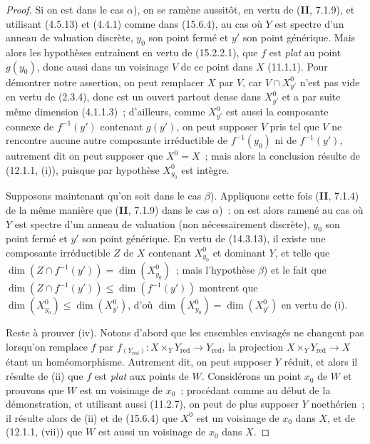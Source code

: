 \begin{proof}
Si on est dans le cas $\alpha$), on se ramène aussitôt, en vertu de (\textbf{II}, 7.1.9), et utilisant (4.5.13) et (4.4.1) comme dans (15.6.4), au cas où $Y$ est spectre d'un anneau de valuation discrète, $y_0$ son point fermé et $y'$ son point générique. Mais alors les hypothèses entraînent en vertu de (15.2.2.1), que $f$ est \emph{plat} au point $g(y_0)$, donc aussi dans un voisinage $V$ de ce point dans $X$ (11.1.1). Pour démontrer notre assertion, on peut remplacer $X$ par $V$, car $V\cap X_{y'}^0$ n'est pas vide en vertu de (2.3.4), donc est un ouvert partout dense dans $X_{y'}^0$ et a par suite même dimension (4.1.1.3)~; d'ailleurs, comme $X_{y'}^0$ est aussi la composante connexe de $f^{-1}(y')$ contenant $g(y')$, on peut supposer $V$ pris tel que $V$ ne rencontre aucune autre composante irréductible de $f^{-1}(y_0)$ ni de $f^{-1}(y')$, autrement dit on peut supposer que $X^0=X$~; mais alors la conclusion résulte de (12.1.1, (i)), puisque par hypothèse $X_{y_0}^0$ est intègre.

Supposons maintenant qu'on soit dans le cas $\beta$). Appliquons cette fois (\textbf{II}, 7.1.4) de la même manière que (\textbf{II}, 7.1.9) dans le cas $\alpha$)~: on est alors ramené au cas où $Y$ est spectre d'un anneau de valuation (non nécessairement discrète), $y_0$ son point fermé et $y'$ son point générique. En vertu de (14.3.13), il existe une composante irréductible $Z$ de $X$ contenant $X_{y_0}^0$ et dominant $Y$, et telle que $\dim(Z\cap f^{-1}(y'))=\dim(X_{y_0}^0)$~; mais l'hypothèse $\beta$) et le fait que $\dim(Z\cap f^{-1}(y'))\leqslant\dim(f^{-1}(y'))$ montrent que $\dim(X_{y_0}^0)\leqslant\dim(X_{y'}^0)$, d'où $\dim(X_{y_0}^0)=\dim(X_{y'}^0)$ en vertu de (i).

Reste à prouver (iv). Notons d'abord que les ensembles envisagés ne changent pas lorsqu'on remplace $f$ par $f_{(Y_{\mathrm{red}})}:X\times_Y Y_{\mathrm{red}}\to Y_{\mathrm{red}}$, la projection $X\times_Y Y_{\mathrm{red}}\to X$ étant un homéomorphisme. Autrement dit, on peut supposer $Y$ réduit, et alors il résulte de (ii) que $f$ est \emph{plat} aux points de $W$. Considérons un point $x_0$ de $W$ et prouvons que $W$ est un voisinage de $x_0$~; procédant comme au début de la démonstration, et utilisant aussi (11.2.7), on peut de plus supposer $Y$ noethérien~; il résulte alors de (ii) et de (15.6.4) que $X^0$ est un voisinage de $x_0$ dans $X$, et de (12.1.1, (vii)) que $W$ est aussi un voisinage de $x_0$ dans $X$.
\end{proof}

